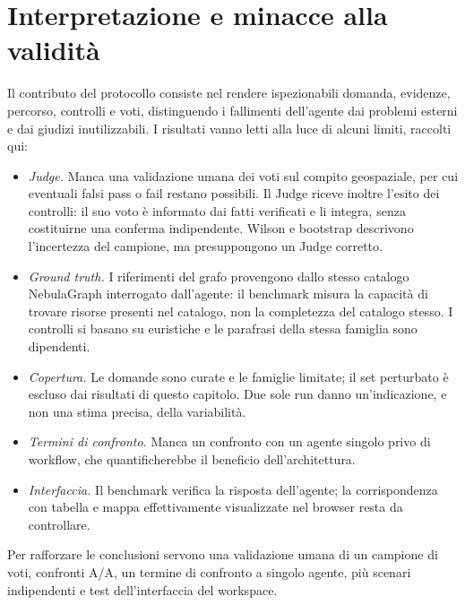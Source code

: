 \section{Interpretazione e minacce alla validità}

Il contributo del protocollo consiste nel rendere ispezionabili domanda,
evidenze, percorso, controlli e voti, distinguendo i fallimenti dell'agente dai
problemi esterni e dai giudizi inutilizzabili. I risultati vanno letti alla
luce di alcuni limiti, raccolti qui:
\begin{itemize}
    \item \emph{Judge.} Manca una validazione umana dei voti sul compito
    geospaziale, per cui eventuali falsi pass o fail restano possibili. Il
    Judge riceve inoltre l'esito dei controlli: il suo voto è informato dai
    fatti verificati e li integra, senza costituirne una conferma
    indipendente. Wilson e bootstrap descrivono l'incertezza del campione, ma
    presuppongono un Judge corretto.
    \item \emph{Ground truth.} I riferimenti del grafo provengono dallo stesso
    catalogo NebulaGraph interrogato dall'agente: il benchmark misura la
    capacità di trovare risorse presenti nel catalogo, non la completezza del
    catalogo stesso. I controlli si basano su euristiche e le parafrasi della
    stessa famiglia sono dipendenti.
    \item \emph{Copertura.} Le domande sono curate e le famiglie limitate; il
    set perturbato è escluso dai risultati di questo capitolo. Due sole run
    danno un'indicazione, e non una stima precisa, della variabilità.
    \item \emph{Termini di confronto.} Manca un confronto con un agente singolo
    privo di workflow, che quantificherebbe il beneficio dell'architettura.
    \item \emph{Interfaccia.} Il benchmark verifica la risposta dell'agente;
    la corrispondenza con tabella e mappa effettivamente visualizzate nel
    browser resta da controllare.
\end{itemize}
Per rafforzare le conclusioni servono una validazione umana di un campione di
voti, confronti A/A, un termine di confronto a singolo agente, più scenari
indipendenti e test dell'interfaccia del workspace.
